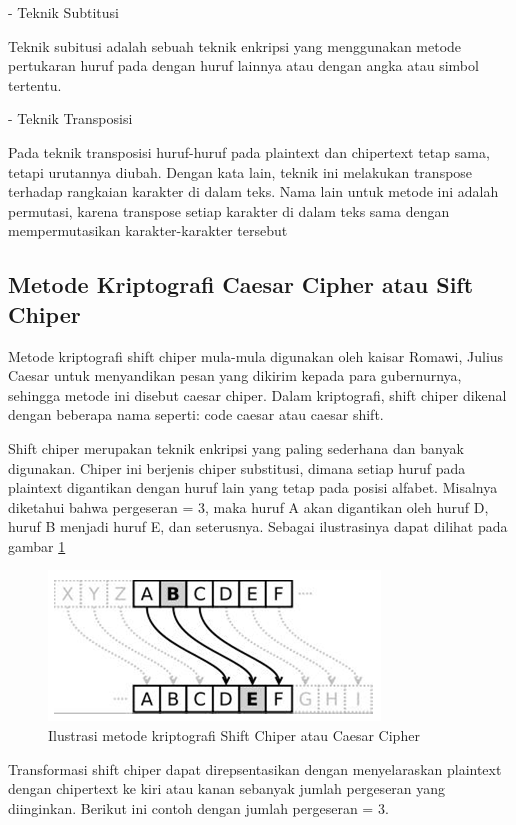 \documentclass{jtetiproposalskripsi}
\begin{document}
- Teknik Subtitusi

Teknik subitusi adalah sebuah teknik enkripsi yang menggunakan metode pertukaran huruf pada dengan huruf lainnya atau dengan angka atau simbol tertentu. 

- Teknik Transposisi

Pada teknik transposisi huruf-huruf pada plaintext dan chipertext tetap sama, tetapi urutannya diubah. Dengan kata lain, teknik ini melakukan transpose terhadap rangkaian karakter di dalam teks. Nama lain untuk metode ini adalah permutasi, karena transpose setiap karakter di dalam teks sama dengan mempermutasikan karakter-karakter tersebut


\subsection{Metode Kriptografi Caesar Cipher atau Sift Chiper}
Metode kriptografi shift chiper mula-mula digunakan oleh kaisar Romawi, Julius Caesar untuk menyandikan pesan yang dikirim kepada para gubernurnya, sehingga metode ini disebut caesar chiper. Dalam kriptografi, shift chiper dikenal dengan beberapa nama seperti: code caesar atau caesar shift. 

Shift chiper merupakan teknik enkripsi yang paling sederhana dan banyak digunakan. Chiper ini berjenis chiper substitusi, dimana setiap huruf pada plaintext digantikan dengan huruf lain yang tetap pada posisi alfabet. Misalnya diketahui bahwa pergeseran = 3, maka huruf A akan digantikan oleh huruf D, huruf B menjadi huruf E, dan seterusnya. Sebagai ilustrasinya dapat dilihat pada gambar \ref{caesar}

\begin{figure}[ht!]
  \centering
    \includegraphics{gambar/caesar}
    \caption{Ilustrasi metode kriptografi Shift Chiper atau Caesar Cipher}
    \label{caesar}
\end{figure}

Transformasi shift chiper dapat direpsentasikan dengan menyelaraskan plaintext dengan chipertext ke kiri atau kanan sebanyak jumlah pergeseran yang diinginkan. Berikut ini contoh dengan jumlah pergeseran = 3. 
\end{document}
